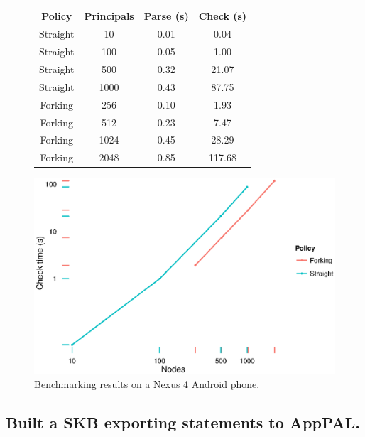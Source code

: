 \documentclass[a4paper]{scrartcl}
\begin{document}
\begin{figure}
  \begin{minipage}{0.49\linewidth}
    \footnotesize
    \begin{tabular}{cccc}
       \toprule
       Policy   & Principals & Parse (s) & Check (s) \\
       \midrule
       Straight & 10    & 0.01      & 0.04      \\
       Straight & 100   & 0.05      & 1.00      \\
       Straight & 500   & 0.32      & 21.07     \\
       Straight & 1000  & 0.43      & 87.75     \\
       \midrule
       Forking  & 256   & 0.10      & 1.93      \\
       Forking  & 512   & 0.23      & 7.47      \\
       Forking  & 1024  & 0.45      & 28.29     \\
       Forking  & 2048  & 0.85      & 117.68    \\
       \bottomrule
    \end{tabular}
  \end{minipage}
  \begin{minipage}{0.49\linewidth}
    \includegraphics[width=\linewidth]{./images/benchmarks.eps}
  \end{minipage}
  \caption{Benchmarking results on a Nexus 4 Android phone.}
  \label{fig:benchmarks}
\end{figure}

\subsection{Built a \ac{SKB} exporting statements to AppPAL.}
\end{document}
